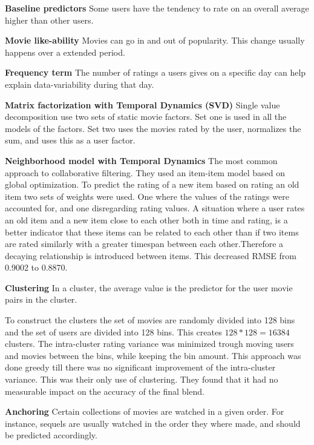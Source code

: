 \textbf{Baseline predictors}  Some users have the tendency to rate on an overall average higher than other users.

\textbf{Movie like-ability}  Movies can go in and out of popularity. This change usually happens over a extended period.

\textbf{Frequency term}  The number of ratings a users gives on a specific day can help explain data-variability during that day.

\textbf{Matrix factorization with Temporal Dynamics (SVD)}  Single value decomposition use two sets of static movie factors. Set one is used in all the models of the factors. Set two uses the movies rated by the user, normalizes the sum, and uses this as a user factor.

\textbf{Neighborhood model with Temporal Dynamics}  The most common approach to collaborative filtering. They used an item-item model based on global optimization. To predict the rating of a new item based on rating an old item two sets of weights were used. One where the values of the ratings were accounted for, and one disregarding rating values.
A situation where a user rates an old item and a new item close to each other both in time and rating, is a better indicator that these items can be related to each other than if two items are rated similarly with a greater timespan between each other.Therefore a decaying relationship is introduced between items. This decreased RMSE from 0.9002 to 0.8870.\cite{BellKor-CF-TD}

\textbf{Clustering}  In a cluster, the average value is the predictor for the user movie pairs in the cluster.

To construct the clusters the set of movies are randomly divided into 128 bins and the set of users are divided into 128 bins. This creates $128*128=16384$ clusters. The intra-cluster rating variance was minimized trough moving users and movies between the bins, while keeping the bin amount. This approach was done greedy till there was no significant improvement of the intra-cluster variance. This was their only use of clustering.
They found that it had no measurable impact on the accuracy of the final blend\cite{pragmatictheory-sol}.

\textbf{Anchoring}  Certain collections of movies are watched in a given order. For instance, sequels are usually watched in the order they where made, and should be predicted accordingly. \\\\


